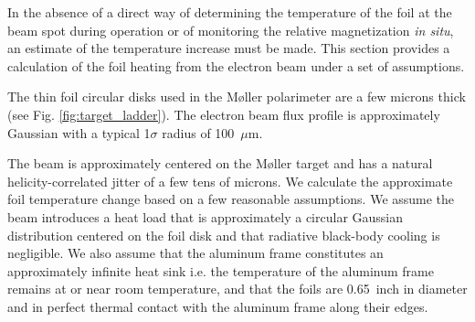 \documentclass[preprint,12pt]{elsarticle}
\begin{document}
In the absence of a direct way of determining the temperature of the foil at the beam spot during operation or of monitoring the relative magnetization {\it in situ}, an estimate of the temperature increase must be made. This section provides a calculation of the foil heating from the electron beam under a set of assumptions.

The thin foil circular disks used in the M\o ller polarimeter are a few microns thick (see Fig. \ref{fig:target_ladder}). The electron beam flux profile is approximately Gaussian with a typical 1$\sigma$ radius of 100~$\mu$m. 

The beam is approximately centered on the M\o ller target and has a natural helicity-correlated jitter of a few tens of microns. We calculate the approximate foil temperature change based on a few reasonable assumptions. We assume the beam introduces a heat load that is approximately a circular Gaussian distribution centered on the foil disk and that radiative black-body cooling is negligible. We also assume that the aluminum frame constitutes an approximately infinite heat sink i.e. the temperature of the aluminum frame remains at or near room temperature, and that the foils are 0.65~inch in diameter and in perfect thermal contact with the aluminum frame along their edges.
\end{document}
